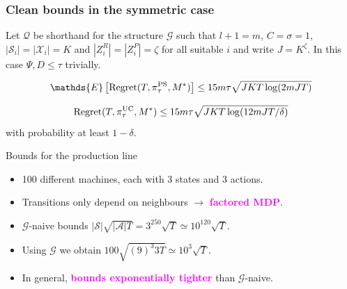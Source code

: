 \documentclass{beamer}
\newlength{\wideitemsep}
\let\olditem\item
\renewcommand{\item}{\setlength{\itemsep}{\wideitemsep}\olditem}
\newcommand{\Exp}{\mathds{E}}
\newcommand{\Xc}{\mathcal{X}}
\newcommand{\Qc}{\mathcal{Q}}
\newcommand{\Gc}{\mathcal{G}}
\newcommand{\Sc}{\mathcal{S}}
\newcommand{\Ac}{\mathcal{A}}
\newcommand{\bspace}{\vspace{3mm}}
\newcommand{\hilite}[1]{\textcolor{magenta}{\textbf{#1}}}
\begin{document}
\begin{frame}
\frametitle{Clean bounds in the symmetric case}
Let $\Qc$ be shorthand for the structure $\Gc$ such that $l+1=m$, $C=\sigma=1$, $| \Sc_i | = |\Xc_i | = K$ and $|Z^R_i| = |Z^P_i | = \zeta$ for all suitable $i$ and write $J = K^\zeta$.
In this case $\Psi, D \le \tau$ trivially.
\vspace{2mm}

\begin{corollary}
\label{cor: reg PSRL}
\begin{equation}
    \Exp \left[\mathrm{Regret}(T, \pi^{\rm PS}_{\tau}, M^*) \right]
    \le 15m \tau \sqrt{J K T \log(2mJ T)}
\end{equation}
\end{corollary}

\begin{corollary}
\label{cor: reg UCRL-Factored}
\begin{equation}
    \mathrm{Regret}(T, \pi^{\rm UC}_{\tau}, M^*) \le  15m \tau \sqrt{J K T \log(12mJT / \delta)}
\end{equation}
with probability at least $1-\delta$.
\end{corollary}
\end{frame}

\begin{frame}{Bounds for the production line}
\begin{itemize}
    \item 100 different machines, each with 3 states and 3 actions.
    \bspace
    \item Transitions only depend on neighbours $\rightarrow$ \hilite{factored MDP}.
    \bspace
    \item $\Gc$-naive bounds $|\Sc| \sqrt{|\Ac|T} = 3^{250}\sqrt{T} \simeq 10^{120} \sqrt{T}$.
    \bspace
    \item Using $\Gc$ we obtain $ 100 \sqrt{(9)^3 3 T} \simeq 10^3 \sqrt{T}$.
    \bspace
    \item In general, \hilite{bounds exponentially tighter} than $\Gc$-naive.

\end{itemize}
\end{frame}
\end{document}

